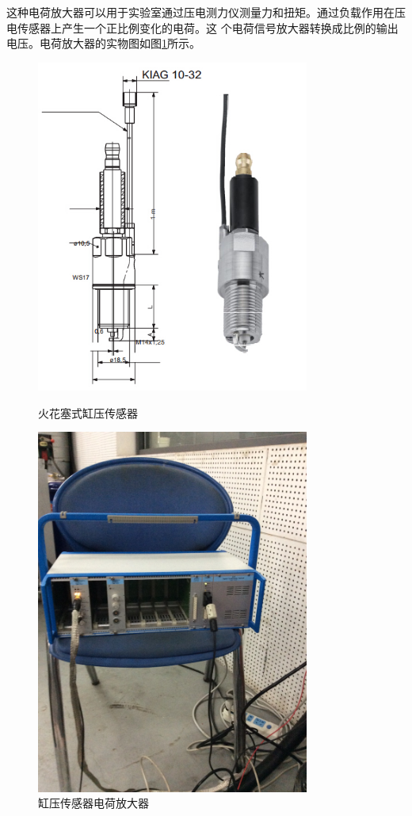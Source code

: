 \par 这种电荷放大器可以用于实验室通过压电测力仪测量力和扭矩。通过负载作用在压电传感器上产生一个正比例变化的电荷。这
个电荷信号放大器转换成比例的输出电压。电荷放大器的实物图如图\ref{fig:gycgqdhfdq}所示。
\begin{figure}[ht]
	\begin{minipage}[H]{0.5\linewidth}
		\includegraphics[width=0.8\textwidth]{thesis_figure/platformer_chapter/gycgq}
		\caption{火花塞式缸压传感器}
		\label{fig:gycgq}
	\end{minipage}
	\begin{minipage}[H]{0.5\linewidth}
		\includegraphics[width=0.8\textwidth]{thesis_figure/platformer_chapter/gycgqdhfdq}
		\caption{缸压传感器电荷放大器}
		\label{fig:gycgqdhfdq}
	\end{minipage}
\end{figure}
